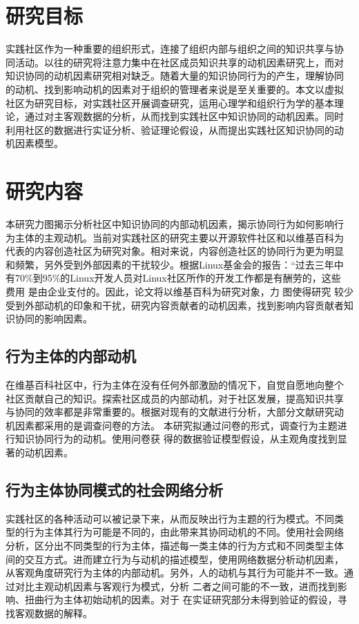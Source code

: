 \documentclass[12pt,a4paper]{ctexart}
\begin{document}
\section{研究目标}
实践社区作为一种重要的组织形式，连接了组织内部与组织之间的知识共享与协
同活动。以往的研究将注意力集中在社区成员知识共享的动机因素研究上，而对
知识协同的动机因素研究相对缺乏。随着大量的知识协同行为的产生，理解协同
的动机、找到影响动机的因素对于组织的管理者来说是至关重要的。本文以虚拟
社区为研究目标，对实践社区开展调查研究，运用心理学和组织行为学的基本理
论，通过对主客观数据的分析，从而找到实践社区中知识协同的动机因素。同时
利用社区的数据进行实证分析、验证理论假设，从而提出实践社区知识协同的动
机因素模型。
\section{研究内容}
本研究力图揭示分析社区中知识协同的内部动机因素，揭示协同行为如何影响行
为主体的主观动机。当前对实践社区的研究主要以开源软件社区和以维基百科为
代表的内容创造社区为研究对象。相对来说，内容创造社区的协同行为更为明显
和频繁，另外受到外部因素的干扰较少。根据Linux基金会的报告：“过去三年中
有70\%到95\%的Linux开发人员对Linux社区所作的开发工作都是有酬劳的，这些
费用 是由企业支付的\cite{linux}。因此，论文将以维基百科为研究对象，力
图使得研究
较少受到外部动机的印象和干扰，研究内容贡献者的动机因素，找到影响内容贡献者知识协同的影响因素。

\subsection{行为主体的内部动机}
在维基百科社区中，行为主体在没有任何外部激励的情况下，自觉自愿地向整个
社区贡献自己的知识。探索社区成员的内部动机，对于社区发展，提高知识共享
与协同的效率都是非常重要的。根据对现有的文献进行分析，大部分文献研究动
机因素都采用的是调查问卷的方法。
本研究拟通过问卷的形式，调查行为主题进行知识协同行为的动机。使用问卷获
得的数据验证模型假设，从主观角度找到显著的动机因素。

\subsection{行为主体协同模式的社会网络分析}
实践社区的各种活动可以被记录下来，从而反映出行为主题的行为模式。不同类
型的行为主体其行为可能是不同的，由此带来其协同动机的不同。使用社会网络
分析，区分出不同类型的行为主体，描述每一类主体的行为方式和不同类型主体
间的交互方式。进而建立行为与动机的描述模型，使用网络数据分析动机因素，
从客观角度研究行为主体的内部动机。另外，人的动机与其行为可能并不一致。通过对比主观动机因素与客观行为模式，分析
二者之间可能的不一致，进而找到影响、扭曲行为主体初始动机的因素。对于
在实证研究部分未得到验证的假设，寻找客观数据的解释。
\end{document}
